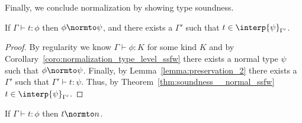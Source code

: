 \noindent
Finally, we conclude normalization by showing type soundness.
\begin{thm}
  If $\Gamma \vdash t:\phi$ then $\phi \normto \psi$, and there exists a $\Gamma'$ such that $t \in \interp{\psi}_{\Gamma'}$.
  \label{thm:soundness_term_ssfw}
\end{thm}
\begin{proof}
  By regularity we know $\Gamma \vdash \phi:K$ for some kind $K$ and by Corollary~\ref{coro:normalization_type_level_ssfw}
  there exists a normal type $\psi$ such that $\phi \normto \psi$.  Finally,
  by Lemma~\ref{lemma:preservation_2} there exists a $\Gamma'$ such that $\Gamma' \vdash t:\psi$.  Thus, by Theorem~\ref{thm:soundness__normal_ssfw} 
  $t \in \interp{\psi}_{\Gamma'}$.
\end{proof}

\begin{corollary}[Normalization]
  If $\Gamma \vdash t:\phi$ then $t \normto n$.
\end{corollary}
